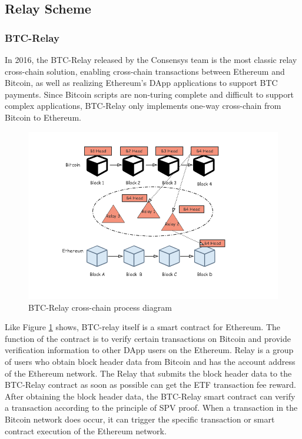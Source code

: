 \subsection{Relay Scheme}
\subsubsection{BTC-Relay}
\noindent In 2016, the BTC-Relay released by the Consensys team is the most classic relay cross-chain solution, enabling cross-chain transactions between Ethereum and Bitcoin, as well as realizing Ethereum's DApp applications to support BTC payments. Since Bitcoin scripts are non-turing complete and difficult to support complex applications, BTC-Relay only implements one-way cross-chain from Bitcoin to Ethereum.
        \begin{figure}[H]
        \includegraphics[width=1\textwidth]{./figures/btc.png}
        \centering
        \caption{BTC-Relay cross-chain process diagram}%
        \centering
        \label{fig:btc}
        \end{figure}
\noindent Like Figure \ref{fig:btc} shows, BTC-relay itself is a smart contract for Ethereum. The function of the contract is to verify certain transactions on Bitcoin and provide verification information to other DApp users on the Ethereum. Relay is a group of users who obtain block header data from Bitcoin and has the account address of the Ethereum network. The Relay that submits the block header data to the BTC-Relay contract as soon as possible can get the ETF transaction fee reward. After obtaining the block header data, the BTC-Relay smart contract can verify a transaction according to the principle of SPV proof. When a transaction in the Bitcoin network does occur, it can trigger the specific transaction or smart contract execution of the Ethereum network.

